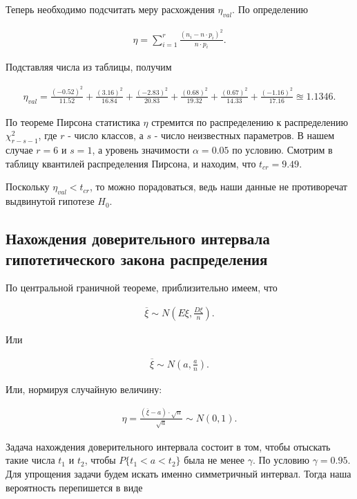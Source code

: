 \documentclass[14pt,a4paper]{scrartcl}
\theoremstyle{definition}
\theoremstyle{remark}
\theoremstyle{definition}
\theoremstyle{definition}
\begin{document}
Теперь необходимо подсчитать меру расхождения $\eta_{val}$. По определению

\begin{align*}
  \eta = \sum_{i=1}^{r} \frac{(n_{i} - n\cdot p_{i})^2}{n\cdot p_{i}}.
\end{align*}

Подставляя числа из таблицы, получим

\begin{align*}
  \eta_{val} = \frac{(-0.52)^2}{11.52} + \frac{(3.16)^2}{16.84} + \frac{(-2.83)^2}{20.83} + \frac{(0.68)^2}{19.32} + \frac{(0.67)^2}{14.33} + \frac{(-1.16)^2}{17.16} \approxeq 1.1346.
\end{align*}

По теореме Пирсона статистика $\eta$ стремится по распределению к распределению $\chi_{r-s-1}^2$, где $r$ - число классов, а $s$ - число неизвестных параметров. В нашем случае $r = 6$ и $s = 1$, а уровень значимости $\alpha = 0.05$ по условию. Смотрим в таблицу квантилей распределения Пирсона, и находим, что $t_{cr} = 9.49.$

Поскольку $\eta_{val} < t_{cr}$, то можно порадоваться, ведь наши данные не противоречат выдвинутой гипотезе $H_{0}$.

\subsection{Нахождения доверительного интервала гипотетического закона распределения}

По центральной граничной теореме, приблизительно имеем, что

\begin{align*}
  \overline{\xi} \sim N(E\xi, \frac{D\xi}{n}).
\end{align*}

Или

\begin{align*}
  \overline{\xi} \sim N(a, \frac{a}{n}).
\end{align*}

Или, нормируя случайную величину:

\begin{align*}
  \eta = \frac{(\overline{\xi}-a)\cdot \sqrt{n}}{\sqrt{a}} \sim N(0, 1).
\end{align*}

Задача нахождения доверительного интервала состоит в том, чтобы отыскать такие числа $t_{1}$ и $t_{2}$, чтобы $P\{t_{1} < a < t_{2}\}$ была не менее $\gamma$. По условию $\gamma = 0.95$. Для упрощения задачи будем искать именно симметричный интервал. Тогда наша вероятность перепишется в виде
\end{document}
